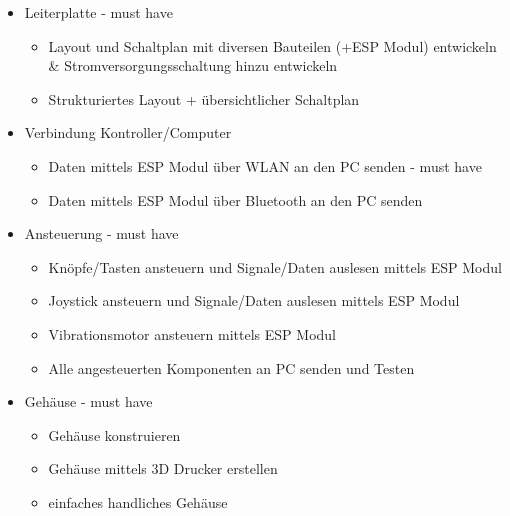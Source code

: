 \begin{itemize}
\item
  Leiterplatte - must have

  \begin{itemize}
  \item
    Layout und Schaltplan mit diversen Bauteilen (+ESP Modul) entwickeln
    \& Stromversorgungsschaltung hinzu entwickeln
  \item
    Strukturiertes Layout + übersichtlicher Schaltplan 
  \end{itemize}
\item
  Verbindung Kontroller/Computer

  \begin{itemize}
  \item
    Daten mittels ESP Modul über WLAN an den PC senden - must have
  \item
    Daten mittels ESP Modul über Bluetooth an den PC senden
  \end{itemize}
\item
  Ansteuerung - must have

  \begin{itemize}
  \item
    Knöpfe/Tasten ansteuern und Signale/Daten auslesen mittels ESP Modul
  \item
    Joystick ansteuern und Signale/Daten auslesen mittels ESP Modul
  \item
    Vibrationsmotor ansteuern mittels ESP Modul
  \item
    Alle angesteuerten Komponenten an PC senden und Testen
  \end{itemize}
\item
  Gehäuse - must have

  \begin{itemize}
  \item
    Gehäuse konstruieren
  \item
    Gehäuse mittels 3D Drucker erstellen
  \item
    einfaches handliches Gehäuse
  \end{itemize}
\end{itemize}


